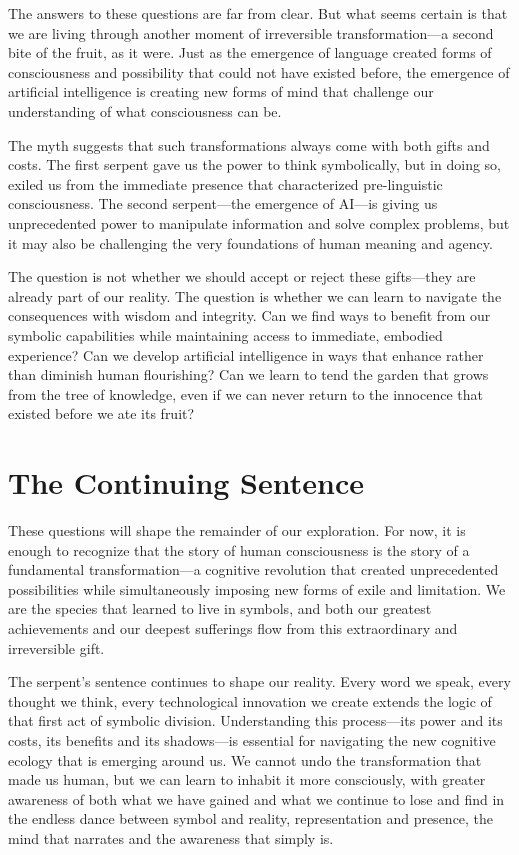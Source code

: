 The answers to these questions are far from clear. But what seems certain is that we are living through another moment of irreversible transformation—a second bite of the fruit, as it were. Just as the emergence of language created forms of consciousness and possibility that could not have existed before, the emergence of artificial intelligence is creating new forms of mind that challenge our understanding of what consciousness can be.

The myth suggests that such transformations always come with both gifts and costs. The first serpent gave us the power to think symbolically, but in doing so, exiled us from the immediate presence that characterized pre-linguistic consciousness. The second serpent—the emergence of AI—is giving us unprecedented power to manipulate information and solve complex problems, but it may also be challenging the very foundations of human meaning and agency.

The question is not whether we should accept or reject these gifts—they are already part of our reality. The question is whether we can learn to navigate the consequences with wisdom and integrity. Can we find ways to benefit from our symbolic capabilities while maintaining access to immediate, embodied experience? Can we develop artificial intelligence in ways that enhance rather than diminish human flourishing? Can we learn to tend the garden that grows from the tree of knowledge, even if we can never return to the innocence that existed before we ate its fruit?

\section{The Continuing Sentence}

These questions will shape the remainder of our exploration. For now, it is enough to recognize that the story of human consciousness is the story of a fundamental transformation—a cognitive revolution that created unprecedented possibilities while simultaneously imposing new forms of exile and limitation. We are the species that learned to live in symbols, and both our greatest achievements and our deepest sufferings flow from this extraordinary and irreversible gift.

The serpent's sentence continues to shape our reality. Every word we speak, every thought we think, every technological innovation we create extends the logic of that first act of symbolic division. Understanding this process—its power and its costs, its benefits and its shadows—is essential for navigating the new cognitive ecology that is emerging around us. We cannot undo the transformation that made us human, but we can learn to inhabit it more consciously, with greater awareness of both what we have gained and what we continue to lose and find in the endless dance between symbol and reality, representation and presence, the mind that narrates and the awareness that simply is.
